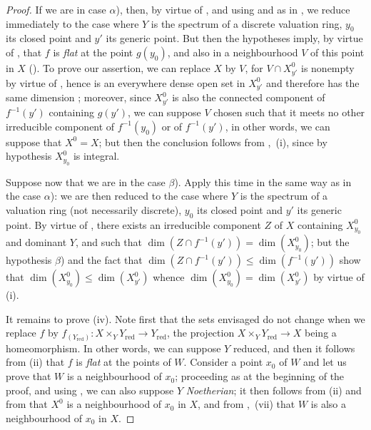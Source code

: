 \begin{proof}
If we are in case $\alpha$), then, by virtue of , and using  and  as in , we reduce immediately to the case where $Y$ is the spectrum of a discrete valuation ring, $y_0$ its closed point and $y'$ its generic point.
But then the hypotheses imply, by virtue of , that $f$ is \emph{flat} at the point $g(y_0)$, and also in a neighbourhood $V$ of this point in $X$ ().
To prove our assertion, we can replace $X$ by $V$, for $V\cap X_{y'}^0$ is nonempty by virtue of , hence is an everywhere dense open set in $X_{y'}^0$ and therefore has the same dimension ; moreover, since $X_{y'}^0$ is also the connected component of $f^{-1}(y')$ containing $g(y')$, we can suppose $V$ chosen such that it meets no other irreducible component of $f^{-1}(y_0)$ or of $f^{-1}(y')$, in other words, we can suppose that $X^0=X$; but then the conclusion follows from ,~(i), since by hypothesis $X_{y_0}^0$ is integral.

Suppose now that we are in the case $\beta$).
Apply this time  in the same way as  in the case $\alpha$): we are then reduced to the case where $Y$ is the spectrum of a valuation ring (not necessarily discrete), $y_0$ its closed point and $y'$ its generic point.
By virtue of , there exists an irreducible component $Z$ of $X$ containing $X_{y_0}^0$ and dominant $Y$, and such that $\dim(Z\cap f^{-1}(y'))=\dim(X_{y_0}^0)$; but the hypothesis $\beta$) and the fact that $\dim(Z\cap f^{-1}(y'))\leq\dim(f^{-1}(y'))$ show that $\dim(X_{y_0}^0)\leq\dim(X_{y'}^0)$ whence $\dim(X_{y_0}^0)=\dim(X_{y'}^0)$ by virtue of (i).

It remains to prove (iv).
Note first that the sets envisaged do not change when we replace $f$ by $f_{(Y_\mathrm{red})}:X\times_Y Y_\mathrm{red}\to Y_\mathrm{red}$, the projection $X\times_Y Y_\mathrm{red}\to X$ being a homeomorphism.
In other words, we can suppose $Y$ reduced, and then it follows from (ii) that $f$ is \emph{flat} at the points of $W$.
Consider a point $x_0$ of $W$ and let us prove that $W$ is a neighbourhood of $x_0$; proceeding as at the beginning of the proof, and using , we can also suppose $Y$ \emph{Noetherian}; it then follows from (ii) and from  that $X^0$ is a neighbourhood of $x_0$ in $X$, and from ,~(vii) that $W$ is also a neighbourhood of $x_0$ in $X$.
\end{proof}

